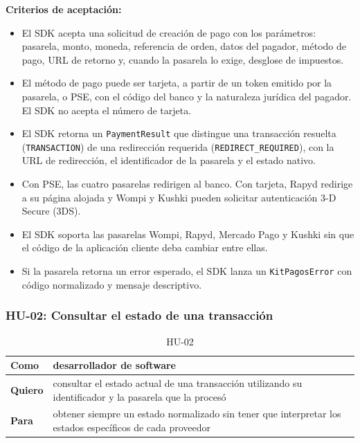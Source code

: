 \textbf{Criterios de aceptación:}
\begin{itemize}
  \item El SDK acepta una solicitud de creación de pago con los parámetros: pasarela, monto, moneda, referencia de orden, datos del pagador, método de pago, URL de retorno y, cuando la pasarela lo exige, desglose de impuestos.
  \item El método de pago puede ser tarjeta, a partir de un token emitido por la pasarela, o PSE, con el código del banco y la naturaleza jurídica del pagador. El SDK no acepta el número de tarjeta.
  \item El SDK retorna un \texttt{PaymentResult} que distingue una transacción resuelta (\texttt{TRANSACTION}) de una redirección requerida (\texttt{REDIRECT\_REQUIRED}), con la URL de redirección, el identificador de la pasarela y el estado nativo.
  \item Con PSE, las cuatro pasarelas redirigen al banco. Con tarjeta, Rapyd redirige a su página alojada y Wompi y Kushki pueden solicitar autenticación 3-D Secure (3DS).
  \item El SDK soporta las pasarelas Wompi, Rapyd, Mercado Pago y Kushki sin que el código de la aplicación cliente deba cambiar entre ellas.
  \item Si la pasarela retorna un error esperado, el SDK lanza un \texttt{KitPagosError} con código normalizado y mensaje descriptivo.
\end{itemize}

\subsubsection{HU-02: Consultar el estado de una transacción}
\begin{table}[H]
  \centering
  \renewcommand{\arraystretch}{1.2}
  \begin{tabularx}{\textwidth}{|l|X|}
    \hline
    \textbf{Como} & desarrollador de software \\
    \hline
    \textbf{Quiero} & consultar el estado actual de una transacción utilizando su identificador y la pasarela que la procesó \\
    \hline
    \textbf{Para} & obtener siempre un estado normalizado sin tener que interpretar los estados específicos de cada proveedor \\
    \hline
  \end{tabularx}
  \caption{HU-02}
  \label{tab:hu-02}
\end{table}

